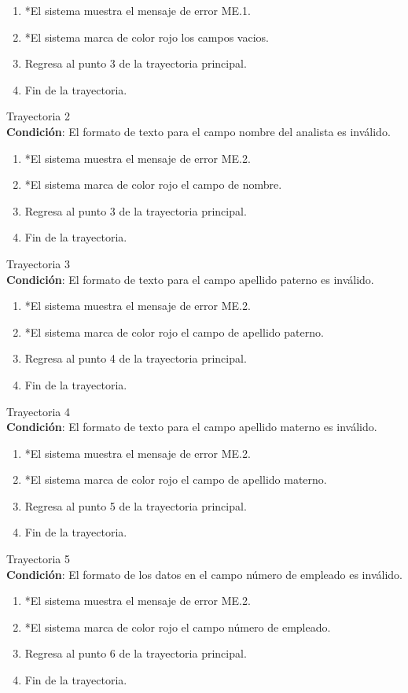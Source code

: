 \begin{enumerate}
    \item *El sistema muestra el mensaje de error ME.1.
    \item *El sistema marca de color rojo los campos vacios.
    \item Regresa al punto 3 de la trayectoria principal.
    \item Fin de la trayectoria.
\end{enumerate}
\large{Trayectoria 2}\\
\textbf{Condición}: El formato de texto para el campo nombre del analista es inválido.
\begin{enumerate}
    \item *El sistema muestra el mensaje de error ME.2.
    \item *El sistema marca de color rojo el campo de nombre.
    \item Regresa al punto 3 de la trayectoria principal.
    \item Fin de la trayectoria.
\end{enumerate}
\large{Trayectoria 3}\\
\textbf{Condición}: El formato de texto para el campo apellido paterno es inválido.
\begin{enumerate}
    \item *El sistema muestra el mensaje de error ME.2.
    \item *El sistema marca de color rojo el campo de apellido paterno.
    \item Regresa al punto 4 de la trayectoria principal.
    \item Fin de la trayectoria.
\end{enumerate}
\large{Trayectoria 4}\\
\textbf{Condición}: El formato de texto para el campo apellido materno es inválido.
\begin{enumerate}
    \item *El sistema muestra el mensaje de error ME.2.
    \item *El sistema marca de color rojo el campo de apellido materno.
    \item Regresa al punto 5 de la trayectoria principal.
    \item Fin de la trayectoria.
\end{enumerate}
\large{Trayectoria 5}\\
\textbf{Condición}: El formato de los datos en el campo número de empleado es inválido.
\begin{enumerate}
    \item *El sistema muestra el mensaje de error ME.2.
    \item *El sistema marca de color rojo el campo número de empleado.
    \item Regresa al punto 6 de la trayectoria principal.
    \item Fin de la trayectoria.
\end{enumerate}
